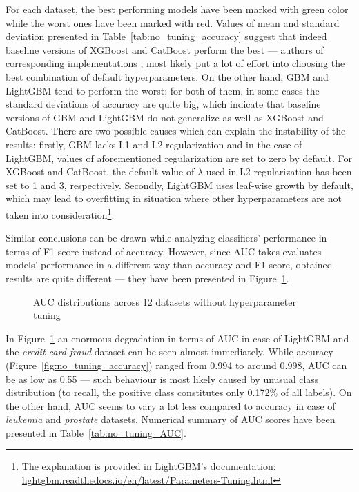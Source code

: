 \documentclass[magisterska, english]{pwr_wmat_praca_dyplomowa}
\theoremstyle{plain}
\numberwithin{theorem}{chapter}
\theoremstyle{definition}
\numberwithin{theorem}{chapter}
\begin{document}
For each dataset, the best performing models have been marked with green color while the worst ones have been marked with red. Values of mean and standard deviation presented in Table~\ref{tab:no_tuning_accuracy} suggest that indeed baseline versions of XGBoost and CatBoost perform the best --- authors of corresponding implementations \cite{xgboost}, \cite{catboost} most likely put a lot of effort into choosing the best combination of default hyperparameters. On the other hand, GBM and LightGBM tend to perform the worst; for both of them, in some cases the standard deviations of accuracy are quite big, which indicate that baseline versions of GBM and LightGBM do not generalize as well as XGBoost and CatBoost. There are two possible causes which can explain the instability of the results: firstly, GBM lacks L1 and L2 regularization and in the case of LightGBM, values of aforementioned regularization are set to zero by default. For XGBoost and CatBoost, the default value of $\lambda$ used in L2 regularization has been set to 1 and 3, respectively. Secondly, LightGBM uses leaf-wise growth by default, which may lead to overfitting in situation where other hyperparameters are not taken into consideration\footnote{The explanation is provided in LightGBM's documentation: \url{lightgbm.readthedocs.io/en/latest/Parameters-Tuning.html}}.

Similar conclusions can be drawn while analyzing classifiers' performance in terms of F1 score instead of accuracy. However, since AUC takes evaluates models' performance in a different way than accuracy and F1 score, obtained results are quite different --- they have been presented in Figure~\ref{fig:no_tuning_AUC}.

\iffalse
\begin{figure}[H]
	\centering
		\scalebox{0.42}{\texttt{[image: main/plots/results\_f1\_score\_12\_datasets\_no\_tuning\_150\_50\_trees\_facet.pdf]}}
	\caption{F1 score distributions across 12 datasets without hyperparameter tuning}
	\label{fig:no_tuning_F1}
\end{figure}
\fi

\begin{figure}[H]
	\centering
	\caption{AUC distributions across 12 datasets without hyperparameter tuning}
	\label{fig:no_tuning_AUC}
\end{figure}

In Figure~\ref{fig:no_tuning_AUC} an enormous degradation in terms of AUC in case of LightGBM and the \emph{credit card fraud} dataset can be seen almost immediately. While accuracy (Figure~\ref{fig:no_tuning_accuracy}) ranged from 0.994 to around 0.998, AUC can be as low as 0.55 --- such behaviour is most likely caused by unusual class distribution (to recall, the positive class constitutes only 0.172\% of all labels). On the other hand, AUC seems to vary a lot less compared to accuracy in case of \emph{leukemia} and \emph{prostate} datasets. Numerical summary of AUC scores have been presented in Table~\ref{tab:no_tuning_AUC}.
\end{document}
